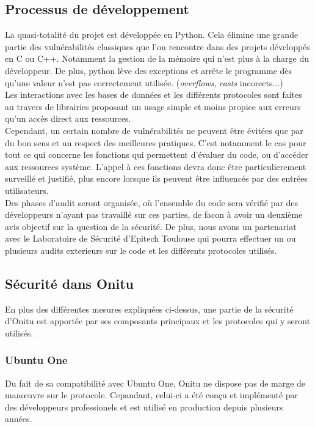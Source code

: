 \subsection{Processus de développement}

La quasi-totalité du projet est développée en Python. Cela élimine une grande partie des vulnérabilités classiques que l'on rencontre dans des projets développés en C ou C++. Notamment la gestion de la mémoire qui n'est plus à la charge du développeur. De plus, python lève des exceptions et arrête le programme dès qu'une valeur n'est pas correctement utilisée. (\textit{overflows}, \textit{casts} incorects...)\\

Les interactions avec les bases de données et les différents protocoles sont faites au travers de librairies proposant un usage simple et moins propice aux erreurs qu'un accès direct aux ressources.\\

Cependant, un certain nombre de vulnérabilités ne peuvent être évitées que par du bon sens et un respect des meilleures pratiques. C'est notamment le cas pour tout ce qui concerne les fonctions qui permettent d'évaluer du code, ou d'accéder aux ressources système. L'appel à ces fonctions devra donc être particulierement surveillé et justifié, plus encore lorsque ils peuvent être influencés par des entrées utilisateurs.\\

Des phases d'audit seront organisée, où l'ensemble du code sera vérifié par des développeurs n'ayant pas travaillé sur ces parties, de facon à avoir un deuxième avis objectif sur la question de la sécurité. De plus, nous avons un partenariat avec le Laboratoire de Sécurité d'Epitech Toulouse qui pourra effectuer un ou plusieurs audits exterieurs sur le code et les différents protocoles utilisés.

\subsection{Sécurité dans Onitu}

En plus des différentes mesures expliquées ci-dessus, une partie de la sécurité d'Onitu est apportée par ses composants principaux et les protocoles qui y seront utilisés.

\subsubsection{Ubuntu One}
Du fait de sa compatibilité avec Ubuntu One, Onitu ne dispose pas de marge de manœuvre sur le protocole. Cepandant, celui-ci a été conçu et implémenté par des développeurs professionels et est utilisé en production depuis plusieurs années.\\

